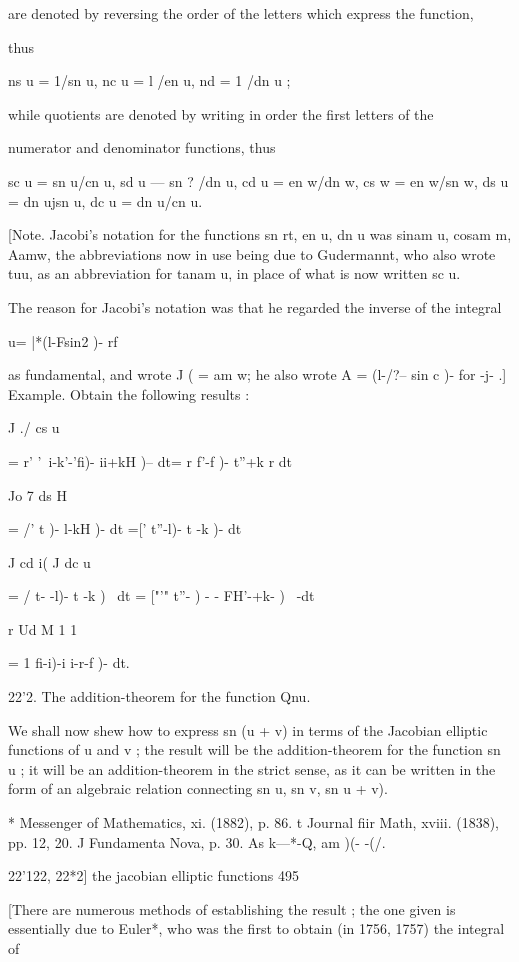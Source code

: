 are denoted by reversing the order of the letters which express the
function,

thus

ns u = 1/sn u, nc u = l /en u, nd = 1 /dn u ;

while quotients are denoted by writing in order the first letters of
the

numerator and denominator functions, thus

sc u = sn u/cn u, sd u — sn ? /dn u, cd u = en w/dn w, cs w = en w/sn
w, ds u = dn ujsn u, dc u = dn u/cn u.

[Note. Jacobi's notation for the functions sn rt, en u, dn u was sinam
u, cosam m, Aamw, the abbreviations now in use being due to
Gudermannt, who also wrote tuu, as an abbreviation for tanam u, in
place of what is now written sc u.

The reason for Jacobi's notation was that he regarded the inverse of
the integral

u= |*(l-Fsin2 )- rf

as fundamental, and wrote J ( = am w; he also wrote A = (l-/?-- sin c
)- for -j- .] Example. Obtain the following results :

J ./ cs u

= r' '\ i-k'-'fi)- ii+kH )-- dt= r f'-f )- t''+k r dt

Jo 7 ds H

= /' t )- l-kH )- dt =[' t''-l)- t -k )- dt

J cd i( J dc u

= / t- -l)- t -k )~ dt = ["'" t''- ) - - FH'-+k- )~ -dt

r Ud M 1 1

= 1 fi-i)-i i-r-f )- dt.

22'2. The addition-theorem for the function Qnu.

We shall now shew how to express sn (u + v) in terms of the Jacobian
elliptic functions of u and v ; the result will be the
addition-theorem for the function sn u ; it will be an
addition-theorem in the strict sense, as it can be written in the form
of an algebraic relation connecting sn u, sn v, sn u + v).

* Messenger of Mathematics, xi. (1882), p. 86. t Journal fiir Math,
xviii. (1838), pp. 12, 20. J Fundamenta Nova, p. 30. As k—*-Q, am )(-
-(/.

22'122, 22*2] the jacobian elliptic functions 495

[There are numerous methods of establishing the result ; the one given
is essentially due to Euler*, who was the first to obtain (in 1756,
1757) the integral of

